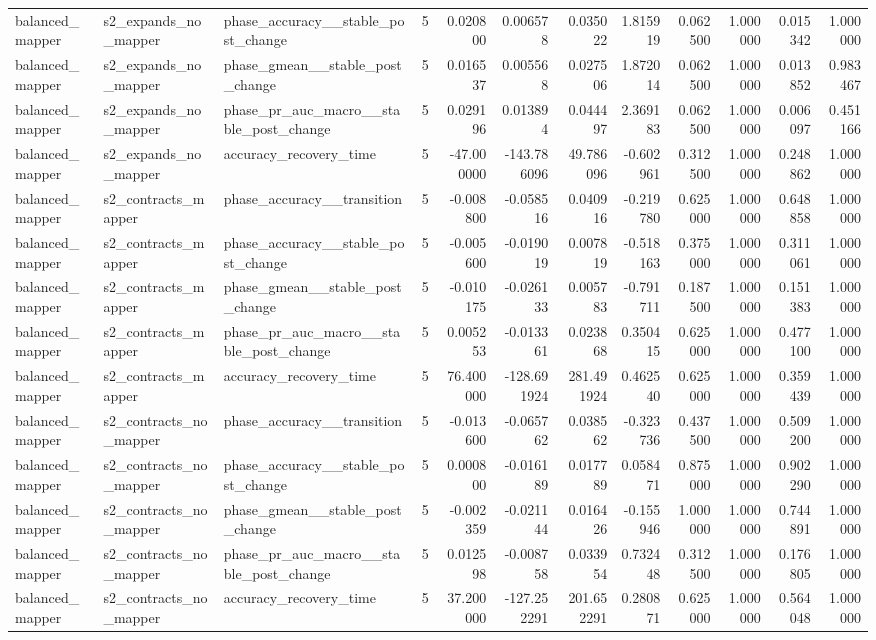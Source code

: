 \begin{tabular}{lllrrrrrrrrr}
balanced\_mapper & s2\_expands\_no\_mapper & phase\_accuracy\_\_stable\_post\_change & 5 & 0.020800 & 0.006578 & 0.035022 & 1.815919 & 0.062500 & 1.000000 & 0.015342 & 1.000000 \\
balanced\_mapper & s2\_expands\_no\_mapper & phase\_gmean\_\_stable\_post\_change & 5 & 0.016537 & 0.005568 & 0.027506 & 1.872014 & 0.062500 & 1.000000 & 0.013852 & 0.983467 \\
balanced\_mapper & s2\_expands\_no\_mapper & phase\_pr\_auc\_macro\_\_stable\_post\_change & 5 & 0.029196 & 0.013894 & 0.044497 & 2.369183 & 0.062500 & 1.000000 & 0.006097 & 0.451166 \\
balanced\_mapper & s2\_expands\_no\_mapper & accuracy\_recovery\_time & 5 & -47.000000 & -143.786096 & 49.786096 & -0.602961 & 0.312500 & 1.000000 & 0.248862 & 1.000000 \\
balanced\_mapper & s2\_contracts\_mapper & phase\_accuracy\_\_transition & 5 & -0.008800 & -0.058516 & 0.040916 & -0.219780 & 0.625000 & 1.000000 & 0.648858 & 1.000000 \\
balanced\_mapper & s2\_contracts\_mapper & phase\_accuracy\_\_stable\_post\_change & 5 & -0.005600 & -0.019019 & 0.007819 & -0.518163 & 0.375000 & 1.000000 & 0.311061 & 1.000000 \\
balanced\_mapper & s2\_contracts\_mapper & phase\_gmean\_\_stable\_post\_change & 5 & -0.010175 & -0.026133 & 0.005783 & -0.791711 & 0.187500 & 1.000000 & 0.151383 & 1.000000 \\
balanced\_mapper & s2\_contracts\_mapper & phase\_pr\_auc\_macro\_\_stable\_post\_change & 5 & 0.005253 & -0.013361 & 0.023868 & 0.350415 & 0.625000 & 1.000000 & 0.477100 & 1.000000 \\
balanced\_mapper & s2\_contracts\_mapper & accuracy\_recovery\_time & 5 & 76.400000 & -128.691924 & 281.491924 & 0.462540 & 0.625000 & 1.000000 & 0.359439 & 1.000000 \\
balanced\_mapper & s2\_contracts\_no\_mapper & phase\_accuracy\_\_transition & 5 & -0.013600 & -0.065762 & 0.038562 & -0.323736 & 0.437500 & 1.000000 & 0.509200 & 1.000000 \\
balanced\_mapper & s2\_contracts\_no\_mapper & phase\_accuracy\_\_stable\_post\_change & 5 & 0.000800 & -0.016189 & 0.017789 & 0.058471 & 0.875000 & 1.000000 & 0.902290 & 1.000000 \\
balanced\_mapper & s2\_contracts\_no\_mapper & phase\_gmean\_\_stable\_post\_change & 5 & -0.002359 & -0.021144 & 0.016426 & -0.155946 & 1.000000 & 1.000000 & 0.744891 & 1.000000 \\
balanced\_mapper & s2\_contracts\_no\_mapper & phase\_pr\_auc\_macro\_\_stable\_post\_change & 5 & 0.012598 & -0.008758 & 0.033954 & 0.732448 & 0.312500 & 1.000000 & 0.176805 & 1.000000 \\
balanced\_mapper & s2\_contracts\_no\_mapper & accuracy\_recovery\_time & 5 & 37.200000 & -127.252291 & 201.652291 & 0.280871 & 0.625000 & 1.000000 & 0.564048 & 1.000000 \\
\bottomrule
\end{tabular}
